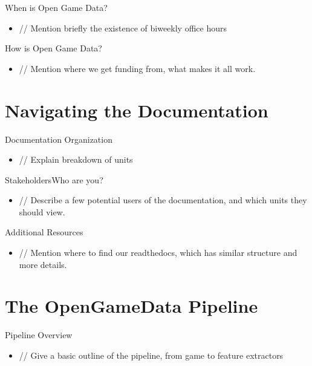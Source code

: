 \documentclass{beamer}
\begin{document}
\begin{frame}{When is Open Game Data?}
  \begin{itemize}
  \item
    // Mention briefly the existence of biweekly office hours
    \pause
  \end{itemize}
\end{frame}

\begin{frame}{How is Open Game Data?}
  \begin{itemize}
  \item
    // Mention where we get funding from, what makes it all work.
    \pause
  \end{itemize}
\end{frame}

\section[Documentation]{Navigating the Documentation}

\begin{frame}{Documentation Organization}
  \begin{itemize}
  \item
    // Explain breakdown of units
    \pause
  \end{itemize}
\end{frame}

\begin{frame}{Stakeholders}{Who are you?}
  \begin{itemize}
  \item
    // Describe a few potential users of the documentation,
    and which units they should view.
    \pause
  \end{itemize}
\end{frame}

\begin{frame}{Additional Resources}
  \begin{itemize}
  \item
    // Mention where to find our readthedocs, which has similar structure and more details.
    \pause
  \end{itemize}
\end{frame}

\section[OGD Pipeline]{The OpenGameData Pipeline}

\begin{frame}{Pipeline Overview}
  \begin{itemize}
  \item
    // Give a basic outline of the pipeline, from game to feature extractors
    \pause
  \end{itemize}
\end{frame}
\end{document}
